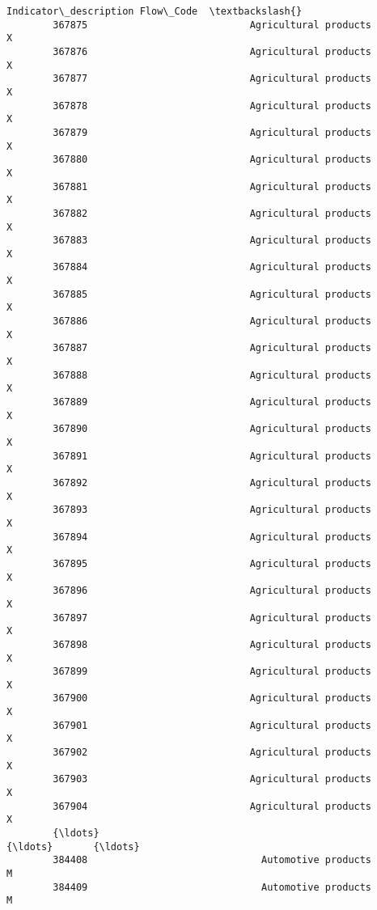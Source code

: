 \documentclass[11pt]{article}
\begin{document}
\begin{Verbatim}[commandchars=\\\{\}]
                                          Indicator\_description Flow\_Code  \textbackslash{}
        367875                            Agricultural products        X    
        367876                            Agricultural products        X    
        367877                            Agricultural products        X    
        367878                            Agricultural products        X    
        367879                            Agricultural products        X    
        367880                            Agricultural products        X    
        367881                            Agricultural products        X    
        367882                            Agricultural products        X    
        367883                            Agricultural products        X    
        367884                            Agricultural products        X    
        367885                            Agricultural products        X    
        367886                            Agricultural products        X    
        367887                            Agricultural products        X    
        367888                            Agricultural products        X    
        367889                            Agricultural products        X    
        367890                            Agricultural products        X    
        367891                            Agricultural products        X    
        367892                            Agricultural products        X    
        367893                            Agricultural products        X    
        367894                            Agricultural products        X    
        367895                            Agricultural products        X    
        367896                            Agricultural products        X    
        367897                            Agricultural products        X    
        367898                            Agricultural products        X    
        367899                            Agricultural products        X    
        367900                            Agricultural products        X    
        367901                            Agricultural products        X    
        367902                            Agricultural products        X    
        367903                            Agricultural products        X    
        367904                            Agricultural products        X    
        {\ldots}                                                 {\ldots}       {\ldots}   
        384408                              Automotive products        M    
        384409                              Automotive products        M    

\end{Verbatim}
\end{document}
